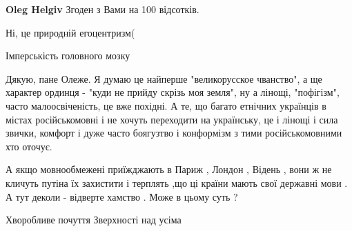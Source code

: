 \begin{itemize}
\begin{itemize}
\textbf{Oleg Helgiv} Згоден з Вами на 100 відсотків.
\end{itemize}

 
Ні, це природній егоцентризм(

 
Імперськість головного мозку

 

Дякую, пане Олеже. Я думаю це найперше "великорусское чванство", а ще характер
ординця - "куди не прийду скрізь моя земля", ну а лінощі, "пофігізм", часто
малоосвіченість, це вже похідні. А те, що багато етнічних українців в містах
російськомовні і не хочуть переходити на українську, це і лінощі і сила
звички, комфорт і дуже часто боягузтво і конформізм з тими російськомовними хто
оточує.


 

А якщо мовнообмежені приїжджають в Париж , Лондон , Відень , вони ж не кличуть
путіна їх захистити і терплять ,що ці країни мають свої державні мови . А тут
деколи - відверте хамство . Може в цьому суть ?

 
Хворобливе почуття
Зверхності над усіма

 

\end{itemize}
